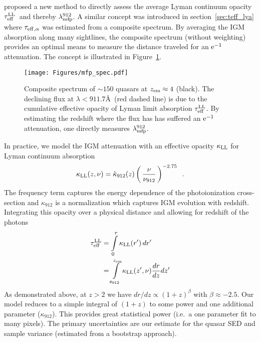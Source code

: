 \documentclass[graybox]{svmult}
\def\ltp{\left ( \,}
\def\rtp{\, \right  ) }
\def\intl{\int\limits}
\def\mlmfp{\lambda_{\rm mfp}^{912}}
\def\lmfp{$\mlmfp$}
\def\mtll{\tau_{\rm eff}^{\rm LL}}
\def\tll{$\mtll$}
\def\mzem{z_{\rm em}}
\begin{document}
\cite{pwo09} proposed a new method to directly assess 
the average Lyman continuum opacity \tll\ and thereby \lmfp.
A similar concept was introduced in section~\ref{sec:teff_lya}
where $\tau_{\rm eff, \alpha}$ was estimated from a composite
spectrum. 
By averaging the IGM absorption along many sightlines, 
the composite spectrum (without weighting) provides 
an optimal means to
measure the distance traveled for an $\rm e^{-1}$ attenuation.
The concept is illustrated in Figure~\ref{fig:mfp_spec}.

%
\begin{figure}[b]
\sidecaption
\texttt{[image: Figures/mfp\_spec.pdf]}
%
%
\caption{Composite spectrum of $\sim 150$ quasars at $\mzem \approx 4$
(black).  The declining flux at $\lambda < 911.7$\AA\ (red
dashed line) is due to the
cumulative effective opacity of Lyman limit absorption \tll.
By estimating the redshift where the flux has 
has suffered an $\rm e^{-1}$ attenuation, one directly
measures \lmfp.
}
\label{fig:mfp_spec}       %
\end{figure}

In practice, we model the IGM attenuation with
an effective opacity $\kappa_{\rm LL}$
for Lyman continuum absorption
\begin{equation}
\kappa_{\rm LL}(z,\nu) = \tilde\kappa_{912}(z) \ltp \frac{\nu}{\nu_{912}} \rtp^{-2.75} \;\; .
\end{equation}
The frequency term captures the energy dependence of the
photoionization cross-section and 
$\kappa_{912}$ is a normalization which captures IGM evolution 
with redshift.
Integrating this opacity over a physical distance and allowing 
for redshift of the photons
\begin{align}
\mtll &= \intl_0^r \kappa_{\rm LL}(r') \, dr'  \\
&= \intl_{\rm z_{912}}^{z_{\rm em}} \kappa_{\rm LL}(z',\nu) \frac{dr}{dz} dz'
\end{align}
As demonstrated above, at $z>2$ we have
$dr/dz \propto (1+z)^\beta$ with $\beta \approx -2.5$.
Our model reduces to a simple integral
of $(1+z)$ to some power and one additional parameter ($\kappa_{912}$).
This provides great statistical power (i.e.\ a one parameter fit to
many pixels).  The primary
uncertainties are our estimate for the quasar SED
and sample variance (estimated from a bootstrap approach).
\end{document}
